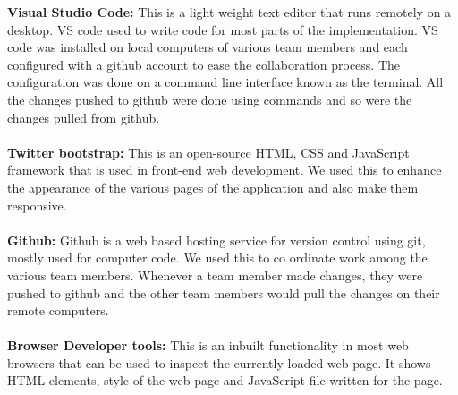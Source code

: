 \textbf{Visual Studio Code: }This is a light weight text editor that runs remotely on a desktop. VS code  used to write code for most parts of the implementation. VS code was installed on local computers of various team members and each configured with a github account to ease the collaboration process. The configuration was done on a command line interface known as the terminal. All the changes pushed to github were done using commands and so were the changes pulled from github.\\\\
\textbf{Twitter bootstrap: }This is an open-source HTML, CSS and JavaScript framework that is used in front-end web development. We used this to enhance the appearance of the various pages of the application and also make them responsive. \\\\
\textbf{Github: }Github is a web based hosting service for version control using git, mostly used for computer code. We used this to co ordinate work among the various team members. Whenever a team member made changes, they were pushed to github and the other team members would pull the changes on their remote computers.\\~\\
\textbf{Browser Developer tools: }This is an inbuilt functionality in most web browsers that can be used to inspect the currently-loaded web page. It shows HTML elements, style of the web page and JavaScript file written for the page.

